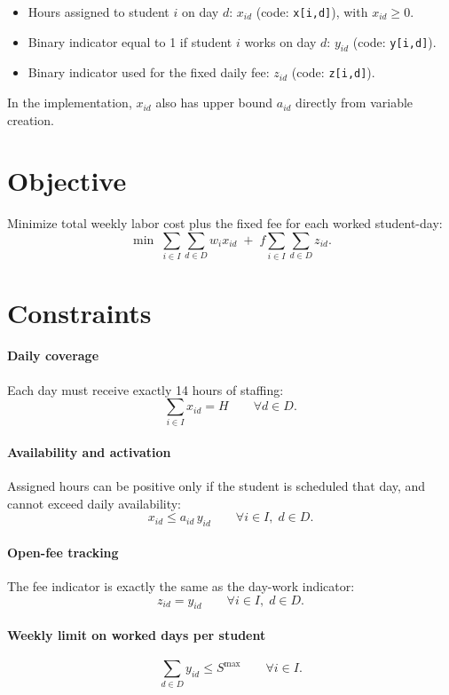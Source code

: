 \begin{itemize}
    \item Hours assigned to student $i$ on day $d$: $x_{id}$ (code: \texttt{x[i,d]}), with $x_{id}\ge 0$.
    \item Binary indicator equal to 1 if student $i$ works on day $d$: $y_{id}$ (code: \texttt{y[i,d]}).
    \item Binary indicator used for the fixed daily fee: $z_{id}$ (code: \texttt{z[i,d]}).
\end{itemize}

In the implementation, $x_{id}$ also has upper bound $a_{id}$ directly from variable creation.

\section*{Objective}

Minimize total weekly labor cost plus the fixed fee for each worked student-day:
\[
\min \;
\sum_{i\in I}\sum_{d\in D} w_i x_{id}
\;+\;
f \sum_{i\in I}\sum_{d\in D} z_{id}.
\]

\section*{Constraints}

\paragraph{Daily coverage}
Each day must receive exactly 14 hours of staffing:
\[
\sum_{i\in I} x_{id} = H
\qquad \forall d\in D.
\]

\paragraph{Availability and activation}
Assigned hours can be positive only if the student is scheduled that day, and cannot exceed daily availability:
\[
x_{id} \le a_{id}\, y_{id}
\qquad \forall i\in I,\; d\in D.
\]

\paragraph{Open-fee tracking}
The fee indicator is exactly the same as the day-work indicator:
\[
z_{id} = y_{id}
\qquad \forall i\in I,\; d\in D.
\]

\paragraph{Weekly limit on worked days per student}
\[
\sum_{d\in D} y_{id} \le S^{\max}
\qquad \forall i\in I.
\]

